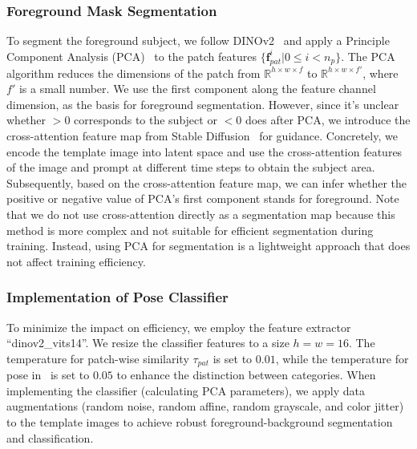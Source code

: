 \subsubsection{Foreground Mask Segmentation}\label{app:pc_seg}

To segment the foreground subject, we follow DINOv2~\citep{oquab2023dinov2, darcet2023vision} and apply a Principle Component Analysis (PCA)~\citep{abdi2010principal} to the patch features $\{\boldsymbol{f}_{pat}^i | 0 \leq i < n_p\}$. The PCA algorithm reduces the dimensions of the patch from $\mathbb{R}^{h \times w \times f}$ to $\mathbb{R}^{h \times w \times f'}$, where $f'$ is a small number. We use the first component along the feature channel dimension, as the basis for foreground segmentation. However, since it's unclear whether $>0$ corresponds to the subject or $<0$ does after PCA, we introduce the cross-attention feature map from Stable Diffusion~\citep{rombach2022high} for guidance. Concretely, we encode the template image into latent space and use the cross-attention features of the image and prompt at different time steps to obtain the subject area. Subsequently, based on the cross-attention feature map, we can infer whether the positive or negative value of PCA's first component stands for foreground. Note that we do not use cross-attention directly as a segmentation map because this method is more complex and not suitable for efficient segmentation during training. Instead, using PCA for segmentation is a lightweight approach that does not affect training efficiency.



\subsubsection{Implementation of Pose Classifier}

To minimize the impact on efficiency, we employ the feature extractor ``dinov2\_vits14''. We resize the classifier features to a size $h=w=16$. The temperature for patch-wise similarity $\tau_{pat}$ is set to $0.01$, while the temperature for pose in~ is set to $0.05$ to enhance the distinction between categories. When implementing the classifier (calculating PCA parameters), we apply data augmentations (random noise, random affine, random grayscale, and color jitter) to the template images to achieve robust foreground-background segmentation and classification.

